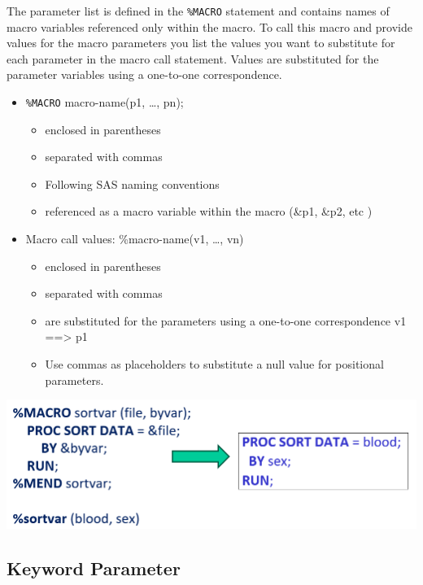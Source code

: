 \documentclass[
]{book}
\providecommand{\tightlist}{%
  \setlength{\itemsep}{0pt}\setlength{\parskip}{0pt}}
\begin{document}
The parameter list is defined in the \texttt{\%MACRO} statement and contains names of macro variables referenced only within the macro. To call this macro and provide values for the macro parameters you list the values you want to substitute for each parameter in the macro call statement. Values are substituted for the parameter variables using a one-to-one correspondence.

\begin{itemize}
\tightlist
\item
  \texttt{\%MACRO} macro-name(p1, \ldots, pn);

  \begin{itemize}
  \tightlist
  \item
    enclosed in parentheses
  \item
    separated with commas
  \item
    Following SAS naming conventions
  \item
    referenced as a macro variable within the macro (\&p1, \&p2, etc )
  \end{itemize}
\item
  Macro call values: \%macro-name(v1, \ldots, vn)

  \begin{itemize}
  \tightlist
  \item
    enclosed in parentheses
  \item
    separated with commas
  \item
    are substituted for the parameters using a one-to-one correspondence v1 ==\textgreater{} p1
  \item
    Use commas as placeholders to substitute a null value for positional parameters.
  \end{itemize}
\end{itemize}

\begin{center}\includegraphics[width=0.8\linewidth]{img14/w14-PositionalMACRO} \end{center}

\hypertarget{keyword-parameter}{%
\subsection{Keyword Parameter}\label{keyword-parameter}}
\end{document}
